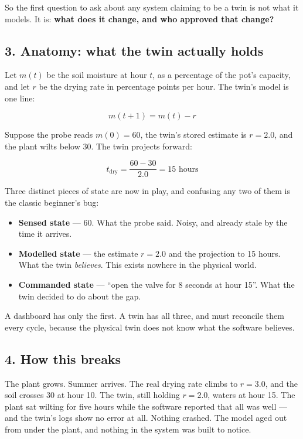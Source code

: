 \documentclass[
  12pt,
  a4paper,
]{article}
\providecommand{\tightlist}{%
  \setlength{\itemsep}{0pt}\setlength{\parskip}{0pt}}
\begin{document}
So the first question to ask about any system claiming to be a twin is
not what it models. It is: \textbf{what does it change, and who approved
that change?}

\subsection{3. Anatomy: what the twin actually
holds}\label{anatomy-what-the-twin-actually-holds}

Let \(m(t)\) be the soil moisture at hour \(t\), as a percentage of the
pot's capacity, and let \(r\) be the drying rate in percentage points
per hour. The twin's model is one line:

\[m(t + 1) = m(t) - r\]

Suppose the probe reads \(m(0) = 60\), the twin's stored estimate is
\(r = 2.0\), and the plant wilts below 30. The twin projects forward:

\[t_{\text{dry}} = \frac{60 - 30}{2.0} = 15 \text{ hours}\]

Three distinct pieces of state are now in play, and confusing any two of
them is the classic beginner's bug:

\begin{itemize}
\tightlist
\item
  \textbf{Sensed state} --- 60. What the probe said. Noisy, and already
  stale by the time it arrives.
\item
  \textbf{Modelled state} --- the estimate \(r = 2.0\) and the
  projection to 15 hours. What the twin \emph{believes}. This exists
  nowhere in the physical world.
\item
  \textbf{Commanded state} --- ``open the valve for 8 seconds at hour
  15''. What the twin decided to do about the gap.
\end{itemize}

A dashboard has only the first. A twin has all three, and must reconcile
them every cycle, because the physical twin does not know what the
software believes.

\subsection{4. How this breaks}\label{how-this-breaks}

The plant grows. Summer arrives. The real drying rate climbs to
\(r = 3.0\), and the soil crosses 30 at hour 10. The twin, still holding
\(r = 2.0\), waters at hour 15. The plant sat wilting for five hours
while the software reported that all was well --- and the twin's logs
show no error at all. Nothing crashed. The model aged out from under the
plant, and nothing in the system was built to notice.
\end{document}

